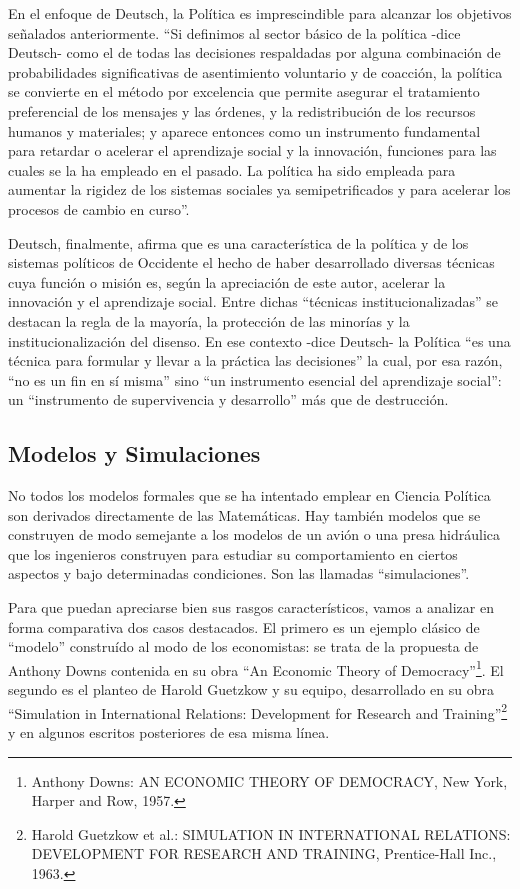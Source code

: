 \documentclass[
]{book}
\begin{document}
En el enfoque de Deutsch, la Política es imprescindible para alcanzar los objetivos señalados anteriormente. ``Si definimos al sector básico de la política -dice Deutsch- como el de todas las decisiones respaldadas por alguna combinación de probabilidades significativas de asentimiento voluntario y de coacción, la política se convierte en el método por excelencia que permite asegurar el tratamiento preferencial de los mensajes y las órdenes, y la redistribución de los recursos humanos y materiales; y aparece entonces como un instrumento fundamental para retardar o acelerar el aprendizaje social y la innovación, funciones para las cuales se la ha empleado en el pasado. La política ha sido empleada para aumentar la rigidez de los sistemas sociales ya semipetrificados y para acelerar los procesos de cambio en curso''.

Deutsch, finalmente, afirma que es una característica de la política y de los sistemas políticos de Occidente el hecho de haber desarrollado diversas técnicas cuya función o misión es, según la apreciación de este autor, acelerar la innovación y el aprendizaje social. Entre dichas ``técnicas institucionalizadas'' se destacan la regla de la mayoría, la protección de las minorías y la institucionalización del disenso. En ese contexto -dice Deutsch- la Política ``es una técnica para formular y llevar a la práctica las decisiones'' la cual, por esa razón, ``no es un fin en sí misma'' sino ``un instrumento esencial del aprendizaje social'': un ``instrumento de supervivencia y desarrollo'' más que de destrucción.

\hypertarget{modelos-y-simulaciones}{%
\subsection*{Modelos y Simulaciones}\label{modelos-y-simulaciones}}

No todos los modelos formales que se ha intentado emplear en Ciencia Política son derivados directamente de las Matemáticas. Hay también modelos que se construyen de modo semejante a los modelos de un avión o una presa hidráulica que los ingenieros construyen para estudiar su comportamiento en ciertos aspectos y bajo determinadas condiciones. Son las llamadas ``simulaciones''.

Para que puedan apreciarse bien sus rasgos característicos, vamos a analizar en forma comparativa dos casos destacados. El primero es un ejemplo clásico de ``modelo'' construído al modo de los economistas: se trata de la propuesta de Anthony Downs contenida en su obra ``An Economic Theory of Democracy''\footnote{Anthony Downs: AN ECONOMIC THEORY OF DEMOCRACY, New York, Harper and Row, 1957.}. El segundo es el planteo de Harold Guetzkow y su equipo, desarrollado en su obra ``Simulation in International Relations: Development for Research and Training''\footnote{Harold Guetzkow et al.: SIMULATION IN INTERNATIONAL RELATIONS: DEVELOPMENT FOR RESEARCH AND TRAINING, Prentice-Hall Inc., 1963.} y en algunos escritos posteriores de esa misma línea.
\end{document}
